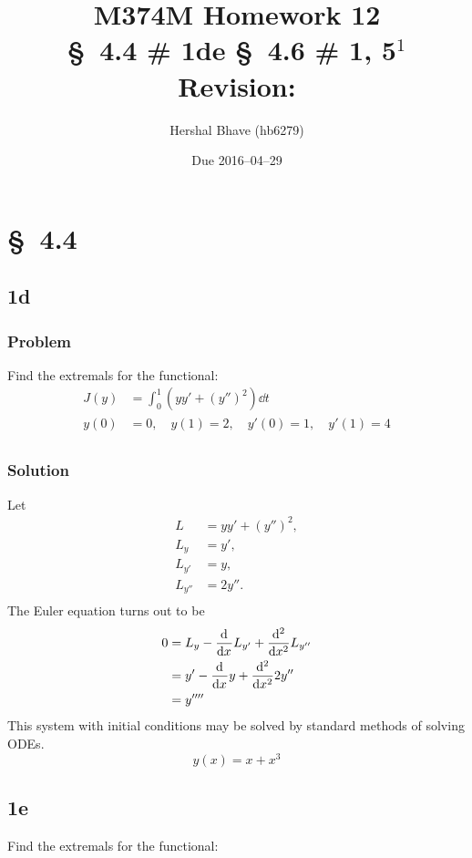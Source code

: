 \documentclass[12pt,twoside]{article}
\title{M374M Homework 12 \\
  \normalsize{\S~4.4 \# 1de \S~4.6 \# 1, 5$^1$} \\
  Revision: }
\author{Hershal Bhave (hb6279)}
\date{Due 2016--04--29}
\begin{document}
\maketitle

\section{\S~4.4}
\subsection{1d}
\subsubsection*{Problem}
Find the extremals for the functional:
\begin{equation}
  \label{eq:4.4.1d-problem}
  \begin{aligned}
    J(y) &= \int_0^1 (yy'+{(y'')}^2)\dd{t} \\
    y(0) &= 0, \quad y(1) = 2, \quad y'(0) = 1,\quad y'(1) = 4 \\
  \end{aligned}
\end{equation}
\subsubsection*{Solution}
Let
\begin{align*}
  L &= yy'+{(y'')}^2, \\
  L_y &= y', \\
  L_{y'} &= y, \\
  L_{y''} &= 2y''. \\
\end{align*}
The Euler equation turns out to be
\begin{align*}
  0 &= L_y - \od{}{x}L_{y'} + \od[2]{}{x}L_{y''} \\
    &= y' - \od{}{x}y + \od[2]{}{x}2y'' \\
    &= y'''' \\
\end{align*}
This system with initial conditions may be solved by standard methods of solving
ODEs.
\begin{equation*}
  \boxed{y(x) = x + x^3}
\end{equation*}

\subsection{1e}
Find the extremals for the functional:
\end{document}
